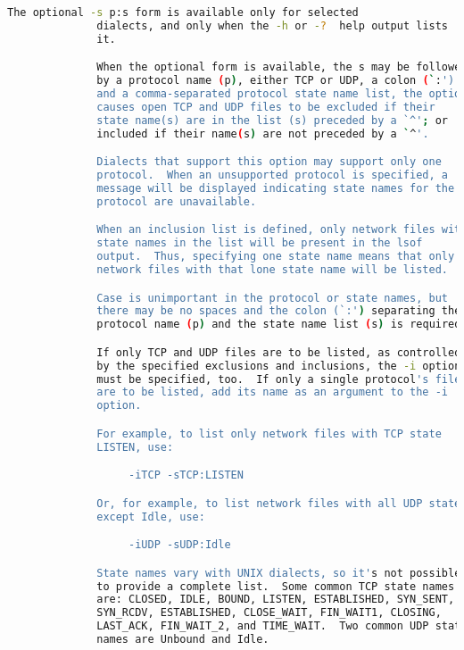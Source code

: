 {{\begin{lstlisting}[language=bash]
              The optional -s p:s form is available only for selected
              dialects, and only when the -h or -?  help output lists
              it.

              When the optional form is available, the s may be followed
              by a protocol name (p), either TCP or UDP, a colon (`:')
              and a comma-separated protocol state name list, the option
              causes open TCP and UDP files to be excluded if their
              state name(s) are in the list (s) preceded by a `^'; or
              included if their name(s) are not preceded by a `^'.

              Dialects that support this option may support only one
              protocol.  When an unsupported protocol is specified, a
              message will be displayed indicating state names for the
              protocol are unavailable.

              When an inclusion list is defined, only network files with
              state names in the list will be present in the lsof
              output.  Thus, specifying one state name means that only
              network files with that lone state name will be listed.

              Case is unimportant in the protocol or state names, but
              there may be no spaces and the colon (`:') separating the
              protocol name (p) and the state name list (s) is required.

              If only TCP and UDP files are to be listed, as controlled
              by the specified exclusions and inclusions, the -i option
              must be specified, too.  If only a single protocol's files
              are to be listed, add its name as an argument to the -i
              option.

              For example, to list only network files with TCP state
              LISTEN, use:

                   -iTCP -sTCP:LISTEN

              Or, for example, to list network files with all UDP states
              except Idle, use:

                   -iUDP -sUDP:Idle

              State names vary with UNIX dialects, so it's not possible
              to provide a complete list.  Some common TCP state names
              are: CLOSED, IDLE, BOUND, LISTEN, ESTABLISHED, SYN_SENT,
              SYN_RCDV, ESTABLISHED, CLOSE_WAIT, FIN_WAIT1, CLOSING,
              LAST_ACK, FIN_WAIT_2, and TIME_WAIT.  Two common UDP state
              names are Unbound and Idle.


\end{lstlisting}}}
